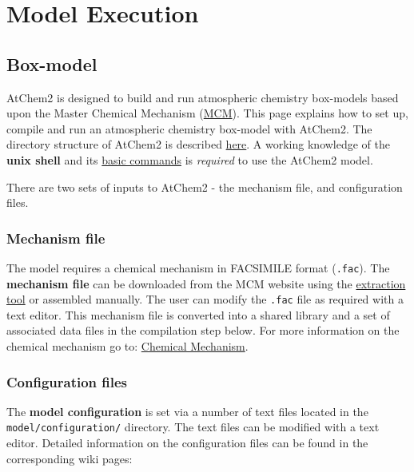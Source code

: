 \chapter{Model Execution} \label{ch:execution}

\section{Box-model} \label{sec:boxmodel}

AtChem2 is designed to build and run atmospheric chemistry box-models
based upon the Master Chemical Mechanism
(\href{http://mcm.leeds.ac.uk/MCM/}{MCM}). This page explains how to
set up, compile and run an atmospheric chemistry box-model with
AtChem2. The directory structure of AtChem2 is described
\hyperref[sec:structure]{here}. A working knowledge of the
\textbf{unix shell} and its
\href{https://swcarpentry.github.io/shell-novice/reference/}{basic
  commands} is \emph{required} to use the AtChem2 model.

There are two sets of inputs to AtChem2 - the mechanism file, and
configuration files.

\subsection{Mechanism file} \label{subsec:mechanism-file}

The model requires a chemical mechanism in FACSIMILE format
(\texttt{.fac}). The \textbf{mechanism file} can be downloaded from
the MCM website using the
\href{http://mcm.leeds.ac.uk/MCMv3.3.1/extract.htt}{extraction tool}
or assembled manually. The user can modify the \texttt{.fac} file as
required with a text editor. This mechanism file is converted into a
shared library and a set of associated data files in the compilation
step below. For more information on the chemical mechanism go to:
\hyperref[sec:mechanism]{Chemical Mechanism}.

\subsection{Configuration files} \label{subsec:configuration-files}

The \textbf{model configuration} is set via a number of text files
located in the \texttt{model/configuration/} directory. The text files
can be modified with a text editor. Detailed information on the
configuration files can be found in the corresponding wiki pages:

